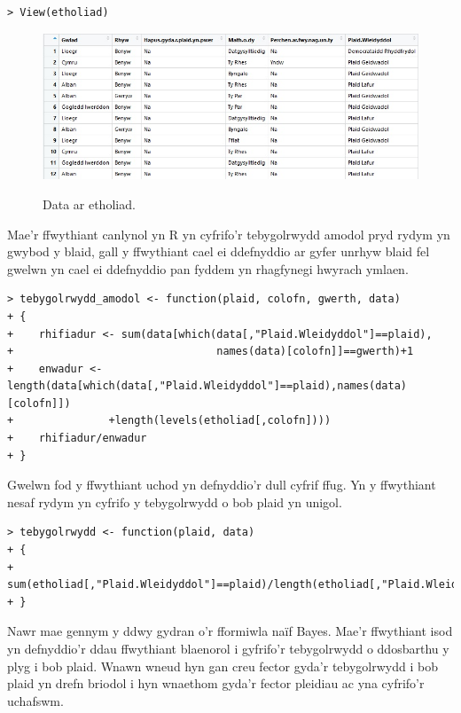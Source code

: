\begin{verbatim}
> View(etholiad)
\end{verbatim}

\begin{figure}[H]
\begin{center}
\includegraphics[width=0.8\linewidth]{../img/data_dosbarthiad.jpg}
\label{fig:data_dosbarthiad}
\caption{Data ar etholiad.}
\end{center}
\end{figure}

Mae'r ffwythiant canlynol yn R yn cyfrifo'r tebygolrwydd amodol pryd rydym yn gwybod y blaid, gall y ffwythiant cael ei ddefnyddio ar gyfer unrhyw blaid fel gwelwn yn cael ei ddefnyddio pan fyddem yn rhagfynegi hwyrach ymlaen.

\begin{verbatim}
> tebygolrwydd_amodol <- function(plaid, colofn, gwerth, data)
+ {
+    rhifiadur <- sum(data[which(data[,"Plaid.Wleidyddol"]==plaid),
+                                names(data)[colofn]]==gwerth)+1 
+    enwadur <- length(data[which(data[,"Plaid.Wleidyddol"]==plaid),names(data)[colofn]])
+               +length(levels(etholiad[,colofn])))
+    rhifiadur/enwadur
+ }
\end{verbatim}

Gwelwn fod y ffwythiant uchod yn defnyddio'r dull cyfrif ffug. Yn y ffwythiant nesaf rydym yn cyfrifo y tebygolrwydd o bob plaid yn unigol.

\begin{verbatim}
> tebygolrwydd <- function(plaid, data)
+ {
+   sum(etholiad[,"Plaid.Wleidyddol"]==plaid)/length(etholiad[,"Plaid.Wleidyddol"])
+ }
\end{verbatim}

Nawr mae gennym y ddwy gydran o'r fformiwla na\"{i}f Bayes. Mae'r ffwythiant isod yn defnyddio'r ddau ffwythiant blaenorol i gyfrifo'r tebygolrwydd o ddosbarthu y plyg i bob plaid. Wnawn wneud hyn gan creu fector gyda'r tebygolrwydd i bob plaid yn drefn briodol i hyn wnaethom gyda'r fector pleidiau ac yna cyfrifo'r uchafswm.

